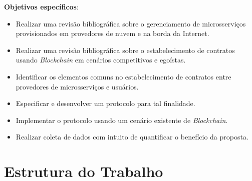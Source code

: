 \vskip 0.5cm
\noindent\textbf{Objetivos específicos}: 
\begin{itemize}
    \item Realizar uma revisão bibliográfica sobre o gerenciamento de microsserviços provisionados em provedores de nuvem e na borda da Internet.
    \item Realizar uma revisão bibliográfica sobre o estabelecimento de contratos usando \textit{Blockchain} em cenários competitivos e egoístas.
    \item Identificar os elementos comuns no estabelecimento de contratos entre provedores de microsserviços e usuários.
    \item Especificar e desenvolver um protocolo para tal finalidade.
    \item Implementar o protocolo usando um cenário existente de \textit{Blockchain}.
    \item Realizar coleta de dados com intuito de quantificar o benefício da proposta.
\end{itemize}


\section{Estrutura do Trabalho}
